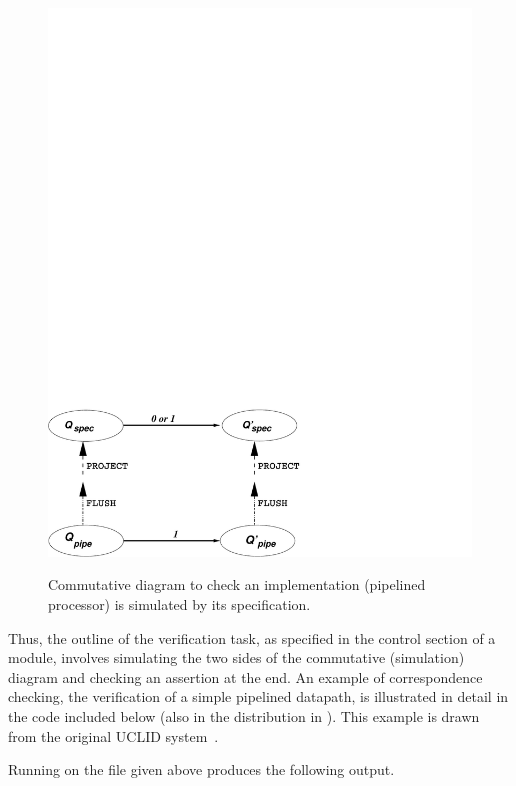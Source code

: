 \begin{figure}[htbp]
\centering
\includegraphics[width=0.7 \columnwidth]{figures/correspond.pdf}
   \label{fig:comm-diag}
	\caption{Commutative diagram to check an implementation (pipelined processor) is simulated by its specification.}
\end{figure}

Thus, the outline of the verification task, as
specified in the control section of a module,
involves simulating the two sides of the commutative (simulation)
diagram and checking an assertion at the end.
An example of correspondence checking, the verification of a simple
pipelined datapath,
is illustrated in detail in the code included below
(also in the distribution in ).
This example is drawn from the original UCLID system~\cite{uclid-www,bryant-cav02}.

    


Running \uclid{} on the file given above produces the following output.


